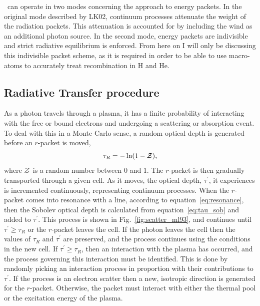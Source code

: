 \py\ can operate in two modes concerning the approach to energy packets. 
In the original mode described by LK02, continuum processes attenuate 
the weight of the radiation packets. This attenuation is accounted for 
by including the wind as an additional photon source.
In the second mode, energy packets are indivisible and strict radiative equilibrium is
enforced. From here on I will only be discussing this indivisible packet scheme, 
as it is required in order to be able to use macro-atoms to accurately
treat recombination in H and He.

\subsection{Radiative Transfer procedure}

\label{sec:rt_procedure}

As a photon travels through a plasma, it has a finite probability
of interacting with the free or bound electrons and undergoing a scattering
or absorption event. To deal with this in a Monte Carlo sense, a random optical 
depth is generated before an $r$-packet is moved,
\begin{equation}
\tau_R = - \ln (1 - {\cal Z}),
\end{equation}
where ${\cal Z}$ is a random number between 0 and 1. 
The $r$-packet is then gradually transported through a given cell. 
As it moves, the optical depth, $\tau^\prime$, it experiences
is incremented continuously, representing continuum processes. When the $r$-packet comes
into resonance with a line, according to equation~\ref{eq:resonance}, then
the Sobolev optical depth is calculated from equation~\ref{eq:tau_sob} and added to 
$\tau^\prime$. This process is shown in Fig.~\ref{fig:scatter_ml93}, and
continues until $\tau^\prime \geq \tau_R$ or the $r$-packet leaves the cell. If the
photon leaves the cell then the values of $\tau_R$ and $\tau^\prime$ are preserved,
and the process continues using the conditions in the new cell. If 
$\tau^\prime \geq \tau_R$, then an interaction with the plasma has occurred, and
the process governing this interaction must be identified. This is done by
randomly picking an interaction process in proportion with their contributions
to $\tau^\prime$. If the process is an electron scatter then a new, isotropic
direction is generated for the $r$-packet. Otherwise, the packet must
interact with either the thermal pool or the excitation energy of the plasma.

